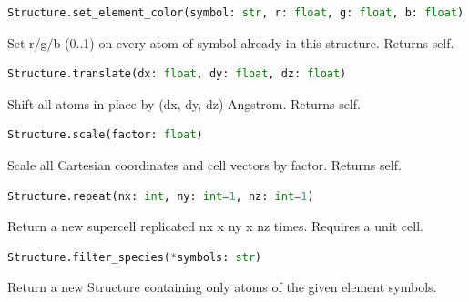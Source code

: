 \begin{samepage}

\begin{lstlisting}[language=Python]
Structure.set_element_color(symbol: str, r: float, g: float, b: float)
\end{lstlisting}

Set r/\allowbreak{}g/\allowbreak{}b (0..1) on every atom of symbol already in this structure. Returns self.

\end{samepage}



\begin{samepage}

\begin{lstlisting}[language=Python]
Structure.translate(dx: float, dy: float, dz: float)
\end{lstlisting}

Shift all atoms in-place by (dx, dy, dz) Angstrom.  Returns self.

\end{samepage}



\begin{samepage}

\begin{lstlisting}[language=Python]
Structure.scale(factor: float)
\end{lstlisting}

Scale all Cartesian coordinates and cell vectors by factor.  Returns self.

\end{samepage}



\begin{samepage}

\begin{lstlisting}[language=Python]
Structure.repeat(nx: int, ny: int=1, nz: int=1)
\end{lstlisting}

Return a new supercell replicated nx x ny x nz times.  Requires a unit cell.

\end{samepage}



\begin{samepage}

\begin{lstlisting}[language=Python]
Structure.filter_species(*symbols: str)
\end{lstlisting}

Return a new Structure containing only atoms of the given element symbols.

\end{samepage}



